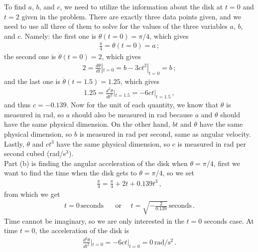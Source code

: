 \documentclass[11pt]{article}
\begin{document}
To find $a$, $b$, and $c$, we need to utilize the information about the disk at $t = 0$ and $t = 2$ given in the problem. There are exactly three data points given, and we need to use all three of them to solve for the values of the three variables $a$, $b$, and $c$. Namely: the first one is $\theta(t=0) = \pi/4$, which gives
\begin{align*}
\frac{\pi}{4}=\theta(t=0) = a\,;
\end{align*}
the second one is $\dot{\theta}(t=0) = 2$, which gives
\begin{align*}
2 =\frac{d\theta}{dt}|_{t = 0} = b - 3ct^2 |_{t = 0} = b\,;
\end{align*}
and the last one is $\ddot{\theta}(t=1.5) = 1.25$, which gives
\begin{align*}
1.25 = \frac{d^2 \theta}{dt^2}|_{t = 1.5} = -6ct|_{t=1.5}\,,
\end{align*}
and thus $c = -0.139$. Now for the unit of each quantity, we know that $\theta$ is measured in rad, so $a$ should also be measured in rad because $a$ and $\theta$ should have the same physical dimension. On the other hand, $bt$ and $\theta$ have the same physical dimension, so $b$ is measured in rad per second, same as angular velocity. Lastly, $\theta$ and $ct^3$ have the same physical dimension, so $c$ is measured in rad per second cubed (rad/s$^3$). \\

Part (b) is finding the angular acceleration of the disk when $\theta = \pi/4$, first we want to find the time when the disk gets to $\theta = \pi/4$, so we set
\begin{align*}
\frac{\pi}{4} = \frac{\pi}{4} + 2t +0.139 t^3\,,
\end{align*}
from which we get 
\begin{align*}
t = 0 \,\text{seconds }\quad \text{ or } \quad t=\sqrt{-\frac{2}{0.139}}\,\text{seconds}\,.
\end{align*}
Time cannot be imaginary, so we are only interested in the $t = 0$ seconds case. At time $t = 0$, the acceleration of the disk is 
\begin{align*}
\frac{d^2 \theta}{dt^2}|_{t = 0} = -6ct|_{t=0} = 0\,\text{rad/s$^2$}\,.
\end{align*}

\end{document}
